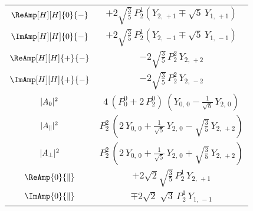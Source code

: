 \begin{table}[p]
\begin{tabular}{cc}
    $\ReAmp[H][H]{0}{-}$  &
      $+2\sqrt{\tfrac{3}{5}}\, P_2^1 (Y_{2,\,+1} \mp \sqrt{5}\, Y_{1,\,+1})$  \\

    $\ImAmp[H][H]{0}{-}$  &
      $+2\sqrt{\tfrac{3}{5}}\, P_2^1 (Y_{2,\,-1} \mp \sqrt{5}\, Y_{1,\,-1})$  \\

    $\ReAmp[H][H]{+}{-}$  &
      $-2\sqrt{\tfrac{3}{5}}\, P_2^2\, Y_{2,\,+2}$  \\

    $\ImAmp[H][H]{+}{-}$  &
      $-2\sqrt{\tfrac{3}{5}}\, P_2^2\, Y_{2,\,-2}$  \\
    \hline

    $|{A}_{0}|^2$  &
      $4\, (P_0^0 + 2\, P_2^0)\, (Y_{0,\,0} - \tfrac{1}{\sqrt{5}}\, Y_{2,\,0})$  \\

    $|{A}_{\parallel}|^2$  &
      $P_2^2\, (2\, Y_{0,\,0} + \tfrac{1}{\sqrt{5}}\, Y_{2,\,0} - \sqrt{\tfrac{3}{5}}\, Y_{2,\,+2})$  \\

    $|{A}_{\perp}|^2$  &
      $P_2^2\, (2\, Y_{0,\,0} + \tfrac{1}{\sqrt{5}}\, Y_{2,\,0} + \sqrt{\tfrac{3}{5}}\, Y_{2,\,+2})$  \\

    $\ReAmp{0}{\parallel}$  &
      $+2\sqrt{2}\sqrt{\tfrac{3}{5}}\, P_2^1\, Y_{2,\,+1}$  \\

    $\ImAmp{0}{\parallel}$  &
      $\mp 2\sqrt{2}\;\sqrt{3}\, P_2^1\, Y_{1,\,-1}$  \\


\end{tabular}
\end{table}
